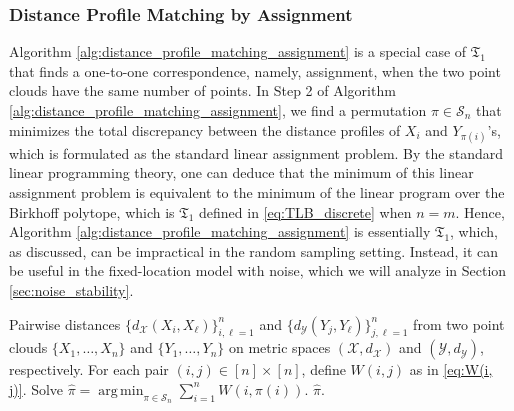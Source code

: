\documentclass[11pt,letterpaper]{article}
\theoremstyle{definition}
\numberwithin{equation}{section}
\newcommand{\cS}{\mathcal{S}}
\newcommand{\cX}{\mathcal{X}}
\newcommand{\cY}{\mathcal{Y}}
\DeclareMathOperator*{\argmin}{arg\,min} %
\begin{document}
\subsubsection{Distance Profile Matching by Assignment}
Algorithm \ref{alg:distance_profile_matching_assignment} is a special case of $\mathfrak{T}_1$ that finds a one-to-one correspondence, namely, assignment, when the two point clouds have the same number of points. In Step 2 of Algorithm \ref{alg:distance_profile_matching_assignment}, we find a permutation $\pi \in \cS_n$ that minimizes the total discrepancy between the distance profiles of $X_i$ and $Y_{\pi(i)}$'s, which is formulated as the standard linear assignment problem. By the standard linear programming theory, one can deduce that the minimum of this linear assignment problem is equivalent to the minimum of the linear program over the Birkhoff polytope, which is $\mathfrak{T}_1$ defined in \eqref{eq:TLB_discrete} when $n = m$. Hence, Algorithm \ref{alg:distance_profile_matching_assignment} is essentially $\mathfrak{T}_1$, which, as discussed, can be impractical in the random sampling setting. Instead, it can be useful in the fixed-location model with noise, which we will analyze in Section \ref{sec:noise_stability}.

\begin{algorithm}[!h]
    \caption{Distance Profile Matching by Assignment}
    \label{alg:distance_profile_matching_assignment}
    \begin{algorithmic}[1]
    \REQUIRE Pairwise distances $\{d_\cX(X_i, X_\ell)\}_{i, \ell = 1}^{n}$ and $\{d_\cY(Y_j, Y_\ell)\}_{j, \ell = 1}^{n}$ from two point clouds $\{X_1, \ldots, X_n\}$ and $\{Y_1, \ldots, Y_n\}$ on metric spaces $(\cX, d_\cX)$ and $(\cY, d_\cY)$, respectively.
    \STATE  For each pair $(i, j) \in [n] \times [n]$, define $W(i, j)$ as in \eqref{eq:W(i, j)}.
    \STATE Solve $\hat{\pi} = \argmin_{\pi \in \cS_n} \sum_{i = 1}^{n} W(i, \pi(i))$.
    \RETURN $\hat{\pi}$.
\end{algorithmic}
\end{algorithm}
\end{document}
